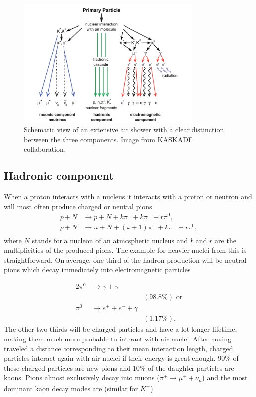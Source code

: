 \begin{figure}
\label{fig:airshower}
\centering
\includegraphics[width=0.8\textwidth]{chapter3/img/airshower.png}
\caption{Schematic view of an extensive air shower with a clear distinction between the three components. Image from KASKADE collaboration.}
\end{figure} 

\subsection{Hadronic component}
When a proton interacts with a nucleus it interacts with a proton or neutron and will most often produce charged or neutral pions
\begin{equation}
\begin{split}
p+N &\rightarrow p+N + k\pi^+ + k\pi^- +r\pi^0,\\
p+N &\rightarrow n+N + (k+1)\pi^+ + k\pi^- + r\pi^0,\\
\end{split}
\end{equation}
where $N$ stands for a nucleon of an atmospheric nucleus and $k$ and $r$ are the multiplicities of the produced pions. The example for heavier nuclei from this is straightforward. On average, one-third of the hadron production will be neutral pions which decay immediately into electromagnetic particles 

\begin{alignat}{2}
\pi^0 &\rightarrow \gamma  +\gamma \\ &&(98.8\%) \textrm{ or}\\
\pi^0 &\rightarrow e^+ + e^- + \gamma \\ &&(1.17\%).
\end{alignat}
The other two-thirds will be charged particles and have a lot longer lifetime, making them much more probable to interact with air nuclei. After having traveled a distance corresponding to their mean interaction length, charged particles interact again with air nuclei if their energy is great enough. 90\% of these charged particles are new pions and 10\% of the daughter particles are kaons. Pions almost exclusively decay into muons ($\pi^+ \rightarrow \mu^+ + \nu_{\mu}$) and the most dominant kaon decay modes are (similar for $K^-$) \cite{pdg}

